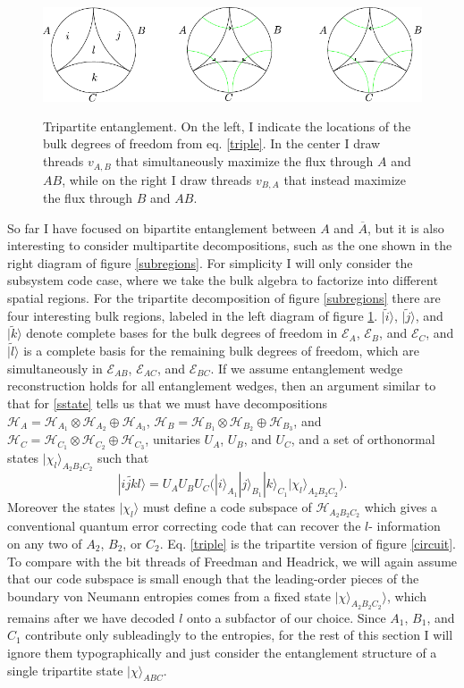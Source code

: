 \documentclass[12pt]{article}
\newcommand{\be}{\begin{equation}}
\newcommand{\ee}{\end{equation}}
\newcommand{\bfig}{\begin{figure}\begin{center}}
\newcommand{\efig}{\end{center}\end{figure}}
\newcommand{\ran}{\rangle}
\newcommand{\wt}{\widetilde}
\newcommand{\Hh}{\mathcal{H}}
\newcommand{\HA}{\mathcal{H}_A}
\newcommand{\Ab}{\ol{A}}
\newcommand{\ol}{\overline}
\begin{document}
\bfig
\includegraphics[height=3.5cm]{subregions2.pdf}
\caption{Tripartite entanglement.  On the left, I indicate the locations of the bulk degrees of freedom from eq. \eqref{triple}.  In the center I draw threads  $v_{A,B}$ that simultaneously maximize the flux through $A$ and $AB$, while on the right I draw threads $v_{B,A}$ that instead maximize the flux through $B$ and $AB$.}\label{mp}
\efig
So far I have focused on bipartite entanglement between $A$ and $\Ab$, but it is also interesting to consider multipartite decompositions, such as the one shown in the right diagram of figure \ref{subregions}.  For simplicity I will only consider the subsystem code case, where we take the bulk algebra to factorize into different spatial regions.  For the tripartite decomposition of figure \ref{subregions} there are four interesting bulk regions, labeled in the left diagram of figure \ref{mp}. $|\wt{i}\ran$, $|\wt{j}\ran$, and $|\wt{k}\ran$ denote complete bases for the bulk degrees of freedom in $\mathcal{E}_A$, $\mathcal{E}_B$, and $\mathcal{E}_C$, and $|\wt{l}\ran$ is a complete basis for the remaining bulk degrees of freedom, which are simultaneously in $\mathcal{E}_{AB}$, $\mathcal{E}_{AC}$, and $\mathcal{E}_{BC}$.  If we assume entanglement wedge reconstruction holds for all entanglement wedges, then an argument similar to that for \eqref{sstate} tells us that we must have decompositions $\HA=\Hh_{A_1}\otimes \Hh_{A_2}\oplus\Hh_{A_3}$, $\Hh_B=\Hh_{B_1}\otimes \Hh_{B_2}\oplus\Hh_{B_3}$, and $\Hh_C=\Hh_{C_1}\otimes \Hh_{C_2}\oplus\Hh_{C_3}$, unitaries $U_A$, $U_B$, and $U_C$, and a set of orthonormal states $|\chi_l\ran_{A_2B_2C_2}$ such that
\be\label{triple}
|\wt{ijkl}\ran=U_A U_B U_C \Big(|i\ran_{A_1}|j\ran_{B_1}|k\ran_{C_1} |\chi_l\ran_{A_2B_2C_2}\Big).
\ee
Moreover the states $|\chi_l\ran$ must define a code subspace of $\Hh_{A_2B_2C_2}$ which gives a conventional quantum error correcting code that can recover the $l$- information on any two of $A_2$, $B_2$, or $C_2$.  Eq. \eqref{triple} is the tripartite version of figure \ref{circuit}.  To compare with the bit threads of Freedman and Headrick, we will again assume that our code subspace is small enough that the leading-order pieces of the boundary von Neumann entropies comes from a fixed state $|\chi\ran_{A_2B_2C_2}\ran$, which remains after we have decoded $l$ onto a subfactor of our choice.  Since $A_1$, $B_1$, and $C_1$ contribute only subleadingly to the entropies, for the rest of this section I will ignore them typographically and just consider the entanglement structure of a single tripartite state $|\chi\ran_{ABC}$.  
\end{document}
